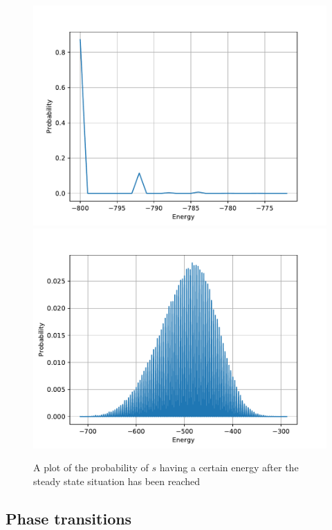 \documentclass[a4paper]{article}
\let\Oldsubsection\subsection
\renewcommand{\subsection}{\FloatBarrier\Oldsubsection}
\begin{document}
\begin{figure}[!htb]
	\centering 
	\includegraphics[scale=0.56]{../opp_d_100000_10K.pdf}
	\includegraphics[scale=0.56]{../opp_d_200000_240K.pdf}
	\caption{A plot of the probability of $s$ having a certain energy after the steady state situation has been reached}
	\label{d}
\end{figure}

\subsection{Phase transitions}
\end{document}
